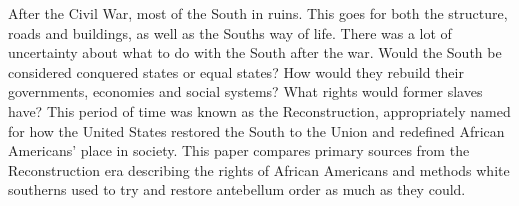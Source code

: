 After the Civil War, most of the South in ruins.
This goes for both the structure, roads and buildings, as well as the Souths way of life.
There was a lot of uncertainty about what to do with the South after the war.
Would the South be considered conquered states or equal states?
How would they rebuild their governments, economies and social systems?
What rights would former slaves have?
This period of time was known as the Reconstruction, appropriately named for how the United States restored the South to the Union and redefined African Americans' place in society.
This paper compares primary sources from the Reconstruction era describing the rights of African Americans and methods white southerns used to try and restore antebellum order as much as they could.